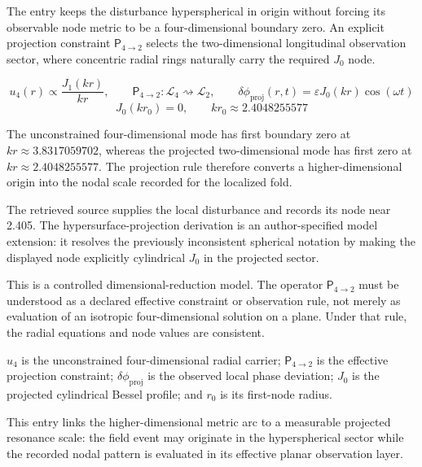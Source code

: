 
The entry keeps the disturbance hyperspherical in origin without forcing its observable node metric to be a four-dimensional boundary zero. An explicit projection constraint \(\mathsf{P}_{4\to2}\) selects the two-dimensional longitudinal observation sector, where concentric radial rings naturally carry the required \(J_0\) node.


\[
u_4(r)\propto\frac{J_1(k r)}{k r},\qquad
\mathsf{P}_{4\to2}:\mathcal{L}_4\rightsquigarrow\mathcal{L}_2,\qquad
\delta\phi_{\mathrm{proj}}(r,t)=\varepsilon J_0(k r)\cos(\omega t)
\]
\[
J_0(k r_0)=0,\qquad k r_0\approx2.4048255577
\]


The unconstrained four-dimensional mode has first boundary zero at \(k r\approx3.8317059702\), whereas the projected two-dimensional mode has first zero at \(k r\approx2.4048255577\). The projection rule therefore converts a higher-dimensional origin into the nodal scale recorded for the localized fold.


The retrieved source supplies the local disturbance and records its node near 2.405. The hypersurface-projection derivation is an author-specified model extension: it resolves the previously inconsistent spherical notation by making the displayed node explicitly cylindrical \(J_0\) in the projected sector.


This is a controlled dimensional-reduction model. The operator \(\mathsf{P}_{4\to2}\) must be understood as a declared effective constraint or observation rule, not merely as evaluation of an isotropic four-dimensional solution on a plane. Under that rule, the radial equations and node values are consistent.


\(u_4\) is the unconstrained four-dimensional radial carrier; \(\mathsf{P}_{4\to2}\) is the effective projection constraint; \(\delta\phi_{\mathrm{proj}}\) is the observed local phase deviation; \(J_0\) is the projected cylindrical Bessel profile; and \(r_0\) is its first-node radius.


This entry links the higher-dimensional metric arc to a measurable projected resonance scale: the field event may originate in the hyperspherical sector while the recorded nodal pattern is evaluated in its effective planar observation layer.

